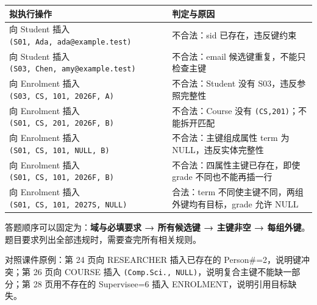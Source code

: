 \begin{longtable}[]{@{}
  >{\raggedright\arraybackslash}p{}
  >{\raggedright\arraybackslash}p{}@{}}
\toprule\noalign{}
\begin{minipage}[b]{\linewidth}\raggedright
拟执行操作
\end{minipage} & \begin{minipage}[b]{\linewidth}\raggedright
判定与原因
\end{minipage} \\
\midrule\noalign{}
\endhead
\bottomrule\noalign{}
\endlastfoot
向 Student 插入 \texttt{(\allowbreak{}S01,\allowbreak{}\ Ada,\allowbreak{}\ ada@example.\allowbreak{}test)\allowbreak{}} & 不合法：sid 已存在，违反键约束 \\
向 Student 插入 \texttt{(\allowbreak{}S03,\allowbreak{}\ Chen,\allowbreak{}\ amy@example.\allowbreak{}test)\allowbreak{}} & 不合法：email 候选键重复，不能只检查主键 \\
向 Enrolment 插入 \texttt{(\allowbreak{}S03,\allowbreak{}\ CS,\allowbreak{}\ 101,\allowbreak{}\ 2026F,\allowbreak{}\ A)\allowbreak{}} & 不合法：Student 没有 S03，违反参照完整性 \\
向 Enrolment 插入 \texttt{(\allowbreak{}S01,\allowbreak{}\ CS,\allowbreak{}\ 201,\allowbreak{}\ 2026F,\allowbreak{}\ B)\allowbreak{}} & 不合法：Course 没有 \texttt{(\allowbreak{}CS,\allowbreak{}201)\allowbreak{}}；不能拆开匹配 \\
向 Enrolment 插入 \texttt{(\allowbreak{}S01,\allowbreak{}\ CS,\allowbreak{}\ 101,\allowbreak{}\ NULL,\allowbreak{}\ B)\allowbreak{}} & 不合法：主键组成属性 term 为 NULL，违反实体完整性 \\
向 Enrolment 插入 \texttt{(\allowbreak{}S01,\allowbreak{}\ CS,\allowbreak{}\ 101,\allowbreak{}\ 2026F,\allowbreak{}\ B)\allowbreak{}} & 不合法：四属性主键已存在，即使 grade 不同也不能再插一行 \\
向 Enrolment 插入 \texttt{(\allowbreak{}S01,\allowbreak{}\ CS,\allowbreak{}\ 101,\allowbreak{}\ 2027S,\allowbreak{}\ NULL)\allowbreak{}} & 合法：term 不同使主键不同，两组外键均有目标，grade 允许 NULL \\
\end{longtable}

答题顺序可以固定为：\textbf{域与必填要求 → 所有候选键 → 主键非空 → 每组外键}。题目要求列出全部违规时，需要查完所有相关规则。

对照课件原例：第 24 页向 RESEARCHER 插入已存在的 Person\#=2，说明键冲突；第 26 页向 COURSE 插入 \texttt{(\allowbreak{}Comp.\allowbreak{}Sci.\allowbreak{},\allowbreak{}\ NULL)\allowbreak{}}，说明复合主键不能缺一部分；第 28 页用不存在的 Supervisee=6 插入 ENROLMENT，说明引用目标缺失。

